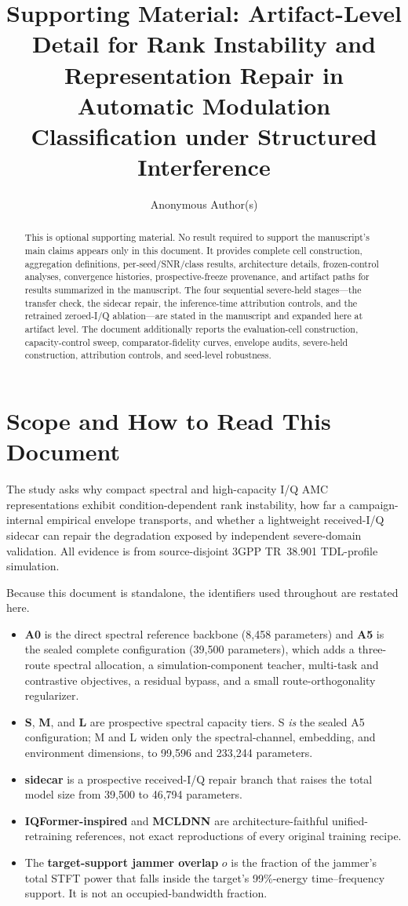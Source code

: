 \documentclass[letterpaper,onecolumn,11pt,journal]{IEEEtran}
\title{Supporting Material: Artifact-Level Detail for Rank Instability and
Representation Repair in Automatic Modulation Classification under Structured
Interference}
\author{Anonymous Author(s)}
\begin{document}
\maketitle

\begin{abstract}
This is optional supporting material. No result required to support the
manuscript's main claims appears only in this document. It provides complete
cell construction, aggregation definitions, per-seed/SNR/class results,
architecture details, frozen-control analyses, convergence histories,
prospective-freeze provenance, and artifact paths for results summarized in the
manuscript. The four sequential severe-held stages---the transfer check, the
sidecar repair, the inference-time attribution controls, and the retrained
zeroed-I/Q ablation---are stated in the manuscript and expanded here at
artifact level. The document additionally reports the evaluation-cell
construction, capacity-control sweep, comparator-fidelity curves, envelope
audits, severe-held construction, attribution controls, and seed-level
robustness.
\end{abstract}

\section{Scope and How to Read This Document}
The study asks why compact spectral and high-capacity I/Q AMC representations
exhibit condition-dependent rank instability, how far a campaign-internal
empirical envelope transports, and whether a lightweight received-I/Q sidecar
can repair the degradation exposed by independent severe-domain
validation. All
evidence is from \mbox{source-disjoint} 3GPP TR~38.901 TDL-profile simulation.

Because this document is standalone, the identifiers used throughout are
restated here.
\begin{itemize}
  \item \textbf{A0} is the direct spectral reference backbone (8{,}458
  parameters) and \textbf{A5} is the sealed complete configuration
  (39{,}500 parameters), which adds a three-route spectral allocation, a
  simulation-component teacher, multi-task and contrastive objectives, a
  residual bypass, and a small route-orthogonality regularizer.
  \item \textbf{S}, \textbf{M}, and \textbf{L} are prospective spectral
  capacity tiers. S \emph{is} the sealed A5 configuration; M and L widen only
  the spectral-channel, embedding, and environment dimensions, to
  99{,}596 and 233{,}244 parameters.
  \item \textbf{sidecar} is a prospective received-I/Q repair branch that
  raises the total model size from 39{,}500 to 46{,}794 parameters.
  \item \textbf{IQFormer-inspired} and \textbf{MCLDNN} are
  architecture-faithful unified-retraining references, not exact reproductions
  of every original training recipe.
  \item The \textbf{target-support jammer overlap} $o$ is the fraction of the
  jammer's total STFT power that falls inside the target's 99\%-energy
  time--frequency support. It is not an occupied-bandwidth fraction.
\end{itemize}
\end{document}
